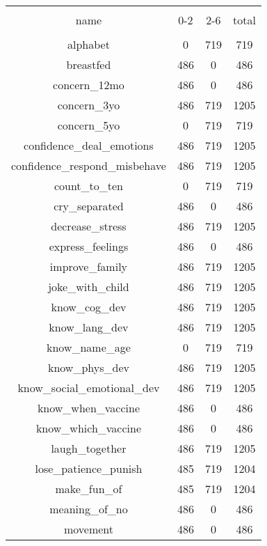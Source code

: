 
\begin{table}[!htbp] \centering 
  \caption{} 
  \label{tbl:respondents_childage} 
\begin{tabular}{@{\extracolsep{5pt}} cccc} 
\\[-1.8ex]\hline 
\hline \\[-1.8ex] 
name & 0-2 & 2-6 & total \\ 
\hline \\[-1.8ex] 
alphabet &   0 & 719 &  719 \\ 
breastfed & 486 &   0 &  486 \\ 
concern\_12mo & 486 &   0 &  486 \\ 
concern\_3yo & 486 & 719 & 1205 \\ 
concern\_5yo &   0 & 719 &  719 \\ 
confidence\_deal\_emotions & 486 & 719 & 1205 \\ 
confidence\_respond\_misbehave & 486 & 719 & 1205 \\ 
count\_to\_ten &   0 & 719 &  719 \\ 
cry\_separated & 486 &   0 &  486 \\ 
decrease\_stress & 486 & 719 & 1205 \\ 
express\_feelings & 486 &   0 &  486 \\ 
improve\_family & 486 & 719 & 1205 \\ 
joke\_with\_child & 486 & 719 & 1205 \\ 
know\_cog\_dev & 486 & 719 & 1205 \\ 
know\_lang\_dev & 486 & 719 & 1205 \\ 
know\_name\_age &   0 & 719 &  719 \\ 
know\_phys\_dev & 486 & 719 & 1205 \\ 
know\_social\_emotional\_dev & 486 & 719 & 1205 \\ 
know\_when\_vaccine & 486 &   0 &  486 \\ 
know\_which\_vaccine & 486 &   0 &  486 \\ 
laugh\_together & 486 & 719 & 1205 \\ 
lose\_patience\_punish & 485 & 719 & 1204 \\ 
make\_fun\_of & 485 & 719 & 1204 \\ 
meaning\_of\_no & 486 &   0 &  486 \\ 
movement & 486 &   0 &  486 \\ 

\end{tabular}
\end{table}
